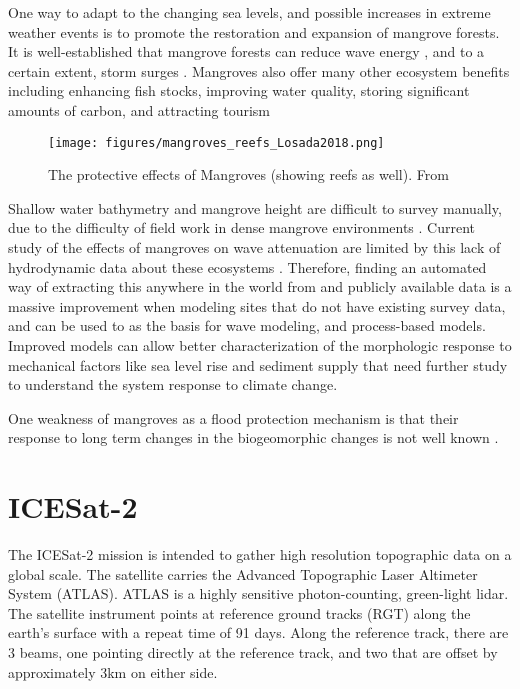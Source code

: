 One way to adapt to the changing sea levels, and possible increases in extreme weather events is to promote the restoration and expansion of mangrove forests. It is well-established that mangrove forests can reduce wave energy \parencite{Maza2019,Menendez2020}, and to a certain extent, storm surges \parencite{Montgomery2019a,Chen2021,Mcivor2012}. Mangroves also offer many other ecosystem benefits including enhancing fish stocks, improving water quality, storing significant amounts of carbon, and attracting tourism \parencite{Atkinson2016b}

\begin{figure}[htbp]
      \centering
      \texttt{[image: figures/mangroves\_reefs\_Losada2018.png]}
      \caption{The protective effects of Mangroves (showing reefs as well). From \parencite{Losada2018}}
      \label{mangrove-protection-diagram}
\end{figure}

Shallow water bathymetry and mangrove height are difficult to survey manually, due to the difficulty of field work in dense mangrove environments \parencite{Gijsman2021}. Current study of the effects of mangroves on wave attenuation are limited by this lack of hydrodynamic data about these ecosystems \parencite{Horstman2014}.  Therefore, finding an automated way of extracting this anywhere in the world from and publicly available data is a massive improvement when modeling sites that do not have existing survey data, and can be used to as the basis for wave modeling, and process-based models. Improved models can allow better characterization of the morphologic response to mechanical factors like sea level rise and sediment supply that need further study to understand the system response to climate change.

One weakness of mangroves as a flood protection mechanism is that their response to long term changes in the biogeomorphic changes is not well known \parencite{Gijsman2021}.

\section{ICESat-2}

The ICESat-2 mission is intended to gather high resolution topographic data on a global scale. The satellite carries the Advanced Topographic Laser Altimeter System (ATLAS). ATLAS is a highly sensitive photon-counting, green-light lidar. The satellite instrument points at reference ground tracks (RGT) along the earth's surface with a repeat time of 91 days. Along the reference track, there are 3 beams, one pointing directly at the reference track, and two that are offset by approximately 3km on either side.

